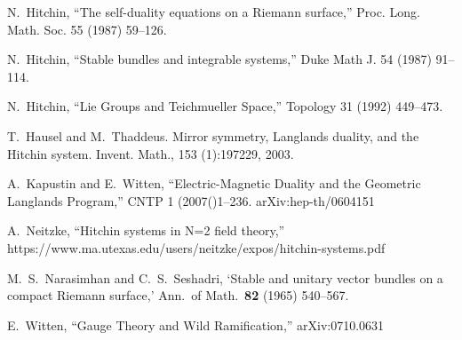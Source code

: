 \documentclass[oneside,english]{amsbook}
\numberwithin{section}{chapter}
\numberwithin{equation}{section}
\numberwithin{figure}{section}
\theoremstyle{plain}
\theoremstyle{definition}
\theoremstyle{remark}
\theoremstyle{definition}
\theoremstyle{definition}
\theoremstyle{plain}
\begin{document}
\begin{thebibliography}{AB}
N.~Hitchin, ``The self-duality equations on a Riemann
surface,'' Proc. Long. Math. Soc. 55 (1987) 59--126. 

N.~Hitchin, ``Stable bundles and integrable systems,''
Duke Math J. 54 (1987) 91--114. 

N.~Hitchin, ``Lie Groups and Teichmueller Space,''
Topology 31 (1992) 449--473. 

T.~Hausel and M.~Thaddeus. Mirror symmetry, Langlands
duality, and the Hitchin system. Invent. Math., 153 (1):197\textendash{}229,
2003. 

A.~Kapustin and E.~Witten, ``Electric-Magnetic
Duality and the Geometric Langlands Program,'' CNTP 1 (2007()1--236.
arXiv:hep-th/0604151

A.~Neitzke, ``Hitchin systems in N=2 field theory,''
https://www.ma.utexas.edu/users/neitzke/expos/hitchin-systems.pdf 

M.~S.~Narasimhan and C.~S.~Seshadri, `Stable
and unitary vector bundles on a compact Riemann surface,' Ann.~of
Math.~\textbf{82} (1965) 540--567.

E.~Witten, ``Gauge Theory and Wild Ramification,''
arXiv:0710.0631\end{thebibliography}
\end{document}
